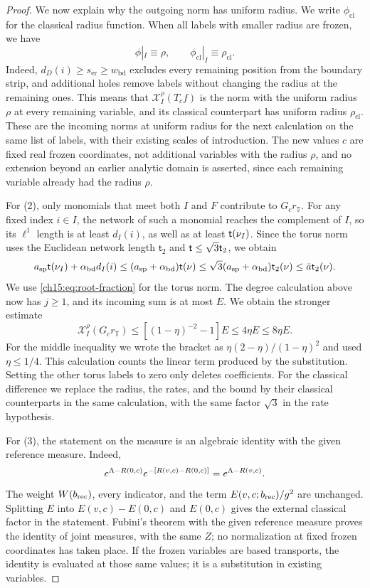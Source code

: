 \begin{proof}
We now explain why the outgoing norm has uniform radius. We write $\phi_{\mathrm{cl}}$ for the classical radius function. When all labels with smaller radius are frozen, we have
\begin{equation}\label{ch15:eq:uniform-surviving-radius}
 \phi|_I\equiv\rho,\qquad
 \phi_{\mathrm{cl}}|_I\equiv\rho_{\mathrm{cl}} .
\end{equation}
Indeed, $d_D(i)\ge s_{\mathrm{er}}\ge w_{\mathrm{bd}}$ excludes every remaining position from the boundary strip, and additional holes remove labels without changing the radius at the remaining ones. This means that $\mathcal X_I^\rho(T_cf)$ is the norm with the uniform radius $\rho$ at every remaining variable, and its classical counterpart has uniform radius $\rho_{\mathrm{cl}}$. These are the incoming norms at uniform radius for the next calculation on the same list of labels, with their existing scales of introduction. The new values $c$ are fixed real frozen coordinates, not additional variables with the radius $\rho$, and no extension beyond an earlier analytic domain is asserted, since each remaining variable already had the radius $\rho$.

For (2), only monomials that meet both $I$ and $F$ contribute to $G_cr_{\mathbb T}$. For any fixed index $i\in I$, the network of such a monomial reaches the complement of $I$, so its $\ell^1$ length is at least $d_I(i)$, as well as at least $\mathsf t(\nu_I)$. Since the torus norm uses the Euclidean network length $\mathsf t_2$ and $\mathsf t\le\sqrt3\mathsf t_2$, we obtain
\[
 a_{\mathrm{sp}}\mathsf t(\nu_I)+\alpha_{\mathrm{bd}} d_I(i)
      \le(a_{\mathrm{sp}}+\alpha_{\mathrm{bd}})\mathsf t(\nu)
      \le\sqrt3(a_{\mathrm{sp}}+\alpha_{\mathrm{bd}})\mathsf t_2(\nu)
      \le\bar a\mathsf t_2(\nu).
\]
We use \eqref{ch15:eq:root-fraction} for the torus norm. The degree calculation above now has $j\ge1$, and its incoming sum is at most $E$. We obtain the stronger estimate
\[
 \mathcal X_I^\rho(G_cr_{\mathbb T})
       \le[(1-\eta)^{-2}-1]E\le4\eta E\le8\eta E .
\]
For the middle inequality we wrote the bracket as $\eta(2-\eta)/(1-\eta)^2$ and used $\eta\le1/4$. This calculation counts the linear term produced by the substitution. Setting the other torus labels to zero only deletes coefficients. For the classical difference we replace the radius, the rates, and the bound by their classical counterparts in the same calculation, with the same factor $\sqrt3$ in the rate hypothesis.

For (3), the statement on the measure is an algebraic identity with the given reference measure. Indeed,
\[
 e^{\Lambda-R(0,c)}e^{-[R(v,c)-R(0,c)]}
                   =e^{\Lambda-R(v,c)} .
\]
The weight $W(b_{\mathrm{rec}})$, every indicator, and the term $E(v,c;b_{\mathrm{rec}})/g^2$ are unchanged. Splitting $E$ into $E(v,c)-E(0,c)$ and $E(0,c)$ gives the external classical factor in the statement. Fubini's theorem with the given reference measure proves the identity of joint measures, with the same $Z$; no normalization at fixed frozen coordinates has taken place. If the frozen variables are based transports, the identity is evaluated at those same values; it is a substitution in existing variables.


\end{proof}
